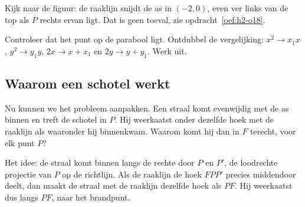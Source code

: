 
Kijk naar de figuur: de raaklijn snijdt de as in $(-2, 0)$, even ver links van de top als $P$ rechts ervan ligt. Dat is geen toeval, zie opdracht~\ref{oef:h2-o18}.

\begin{werkwijze}
Controleer dat het punt op de parabool ligt. Ontdubbel de vergelijking: $x^2 \to x_1 x$, $y^2 \to y_1 y$, $2x \to x + x_1$ en $2y \to y + y_1$. Werk uit.
\end{werkwijze}


\begin{oefeningen}
\end{oefeningen}

\subsection{Waarom een schotel werkt}

Nu kunnen we het probleem aanpakken. Een straal komt evenwijdig met de as binnen en treft de schotel in $P$. Hij weerkaatst onder dezelfde hoek met de raaklijn als waaronder hij binnenkwam. Waarom komt hij dan in $F$ terecht, voor elk punt $P$?

Het idee: de straal komt binnen langs de rechte door $P$ en $P'$, de loodrechte projectie van $P$ op de richtlijn. Als de raaklijn de hoek $FPP'$ precies middendoor deelt, dan maakt de straal met de raaklijn dezelfde hoek als $PF$. Hij weerkaatst dus langs $PF$, naar het brandpunt.

